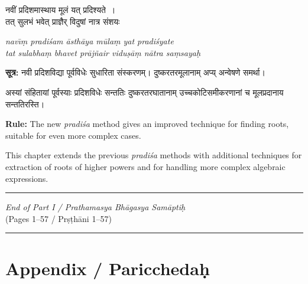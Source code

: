 \documentclass[11pt,a4paper]{article}
\newcommand{\longline}{\noindent\rule{\textwidth}{0.4pt}}
\newcommand{\bicol}[2]{%
\noindent%
\begin{minipage}[t]{0.48\textwidth}
\begin{flushleft}
\small
#1
\end{flushleft}
\end{minipage}%
\hfill%
\begin{minipage}[t]{0.48\textwidth}
\begin{flushleft}
\small
#2
\end{flushleft}
\end{minipage}%
\vspace{0.4em}
}
\newcommand{\bicolverse}[2]{%
\par\noindent%
\begin{minipage}[t]{0.48\textwidth}
\centering
\color{versecolor}
\devanagarifont
\small
#1
\end{minipage}%
\hfill%
\begin{minipage}[t]{0.48\textwidth}
\centering
\color{versecolor}
\small
#2
\end{minipage}%
\par\vspace{0.4em}
}
\begin{document}
\vspace{0.3cm}

\bicolverse{%
नवीं प्रदिशमास्थाय मूलं यत् प्रदिश्यते~।\\
तत् सुलभं भवेत् प्राज्ञैर् विदुषां नात्र संशयः~
}{%
\textit{nav\={\i}\d{m} pradi\'{s}am \={a}sth\={a}ya m\={u}la\d{m} yat pradi\'{s}yate}\\
\textit{tat sulabha\d{m} bhavet pr\={a}j\~{n}air vidu\d{s}\={a}\d{m} n\={a}tra sa\d{ms}aya\d{h}}
}

\vspace{0.5cm}

\bicol{%
\textbf{सूत्र:} नवी प्रदिशविद्या पूर्वविधेः सुधारिता संस्करणम्। दुष्करतरमूलानाम् अप्य् अन्वेषणे समर्था।
\vspace{0.3cm}

अस्यां संहितायां पूर्वस्याः प्रदिशविधेः सन्ततिः दुष्करतरघातानाम् उच्चकोटिसमीकरणानां च मूलप्रदानाय सन्ततिरस्ति।
}{%
\textbf{Rule:} The new \textit{pradi\'{s}a} method gives an improved technique for finding roots, suitable for even more complex cases.
\vspace{0.3cm}

This chapter extends the previous \textit{pradi\'{s}a} methods with additional techniques for extraction of roots of higher powers and for handling more complex algebraic expressions.
}

\clearpage

\vspace{1cm}
\begin{center}
\longline
\vspace{0.5cm}
{\Large\itshape\color{sectioncolor} End of Part I / Prathamasya Bh\={a}gasya Sam\={a}pti\d{h}}\\[0.3cm]
{\normalsize (Pages 1--57 / Pr\d{s}\d{t}h\={a}ni 1--57)}
\vspace{0.5cm}
\longline
\end{center}

\vspace{1cm}

\section*{Appendix / Pariccheda\d{h}}
\end{document}
